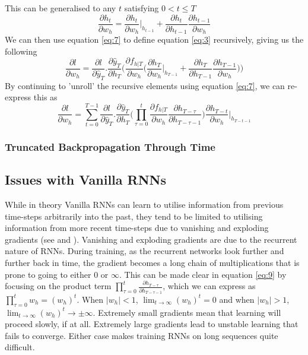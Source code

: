 \documentclass[]{article}
\begin{document}
This can be generalised to any $t$ satisfying $0 < t \leq T$
\begin{equation}
\frac{\partial h_{t}}{\partial w_{h}} = \frac{\partial h_{t}}{\partial w_{h}} \bigg|_{h_{t-1}} + \frac{\partial h_{t}}{\partial h_{t-1}} \frac{\partial h_{t-1}}{\partial w_{h}}\label{eq:7}
\end{equation}
We can then use equation \ref{eq:7} to define equation \ref{eq:3} recursively, giving us the following
\begin{equation}
\frac{\partial l}{\partial w_{h}} = \frac{\partial l}{\partial \hat{y}_{T}} . \frac{\partial \hat{y}_{T}}{\partial h_{T}} \bigg( \frac{\partial f_{h|T}}{\partial w_{h}} \bigg( \frac{\partial h_{T}}{\partial w_{h}} \bigg|_{h_{T-1}} + \frac{\partial h_{T}}{\partial h_{T-1}} \frac{\partial h_{T-1}}{\partial w_{h}} \bigg) \bigg )\label{eq:8}
\end{equation}
By continuing to 'unroll' the recursive elements using equation \ref{eq:7}, we can re-express this as
\begin{equation}
\frac{\partial l}{\partial w_{h}} = \sum_{t=0}^{T-1}  \frac{\partial l}{\partial \hat{y}_{T}} . \frac{\partial \hat{y}_{T}}{\partial h_{T}}  \bigg( \prod_{\tau=0}^{t} \frac{\partial f_{h|T}}{\partial w_{h}} \frac{\partial h_{T - \tau}}{\partial h_{T - \tau-1}} \bigg ) \frac{\partial h_{T-t}}{\partial w_{h}} \bigg|_{h_{T-t-1}} \label{eq:9}
\end{equation}
\subsubsection{Truncated Backpropagation Through Time}
\subsection{Issues with Vanilla RNNs}
While in theory Vanilla RNNs can learn to utilise information from previous time-steps arbitrarily into the past, they tend to be limited to utilising information from more recent time-steps due to vanishing and exploding gradients (see \cite{298725} and \cite{279181}). 
\newline
\newline
Vanishing and exploding gradients are due to the recurrent nature of RNNs. During training, as the recurrent networks look further and further back in time, the gradient becomes a long chain of multiplications that is prone to going to either $0$ or $\infty$. This can be made clear in equation \ref{eq:9} by focusing on the product term $\prod_{\tau=0}^{t} \frac{\partial h_{T - \tau}}{\partial h_{T - \tau-1}}$, which we can express as $\prod_{\tau=0}^{t} w_{h}=(w_{h})^t$. When $|w_{h}| < 1$, $\lim_{t \rightarrow \infty}(w_{h})^t = 0$ and when $|w_{h}| > 1$, $\lim_{t \rightarrow \infty}(w_{h})^t \rightarrow \pm \infty$.
\newline
\newline
Extremely small gradients mean that learning will proceed slowly, if at all. Extremely large gradients lead to unstable learning that fails to converge. Either case makes training RNNs on long sequences quite difficult.
\end{document}
